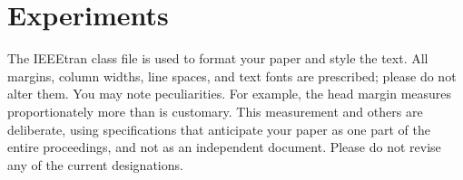 
\section{Experiments} \label{sec:experiments}

The IEEEtran class file is used to format your paper and style the text. All margins, column widths, line spaces, and text fonts are prescribed; please do not  alter them. You may note peculiarities. For example, the head margin
measures proportionately more than is customary. This measurement 
and others are deliberate, using specifications that anticipate your paper 
as one part of the entire proceedings, and not as an independent document. 
Please do not revise any of the current designations.

